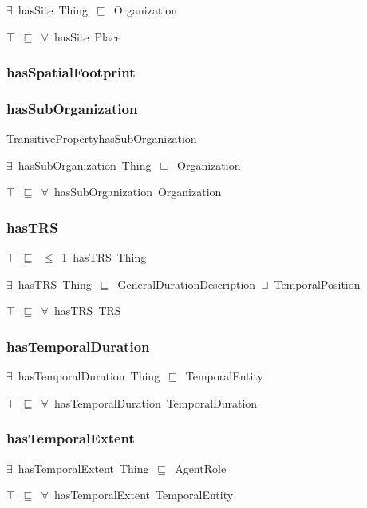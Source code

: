 \documentclass{article}
\begin{document}
\ensuremath{\exists}~hasSite~Thing~\ensuremath{\sqsubseteq}~Organization

\ensuremath{\top}~\ensuremath{\sqsubseteq}~\ensuremath{\forall}~hasSite~Place

\subsubsection*{hasSpatialFootprint}

\subsubsection*{hasSubOrganization}

TransitivePropertyhasSubOrganization

\ensuremath{\exists}~hasSubOrganization~Thing~\ensuremath{\sqsubseteq}~Organization

\ensuremath{\top}~\ensuremath{\sqsubseteq}~\ensuremath{\forall}~hasSubOrganization~Organization

\subsubsection*{hasTRS}

\ensuremath{\top}~\ensuremath{\sqsubseteq}~\ensuremath{\leq}~1~hasTRS~Thing

\ensuremath{\exists}~hasTRS~Thing~\ensuremath{\sqsubseteq}~GeneralDurationDescription~\ensuremath{\sqcup}~TemporalPosition

\ensuremath{\top}~\ensuremath{\sqsubseteq}~\ensuremath{\forall}~hasTRS~TRS

\subsubsection*{hasTemporalDuration}

\ensuremath{\exists}~hasTemporalDuration~Thing~\ensuremath{\sqsubseteq}~TemporalEntity

\ensuremath{\top}~\ensuremath{\sqsubseteq}~\ensuremath{\forall}~hasTemporalDuration~TemporalDuration

\subsubsection*{hasTemporalExtent}

\ensuremath{\exists}~hasTemporalExtent~Thing~\ensuremath{\sqsubseteq}~AgentRole

\ensuremath{\top}~\ensuremath{\sqsubseteq}~\ensuremath{\forall}~hasTemporalExtent~TemporalEntity
\end{document}

